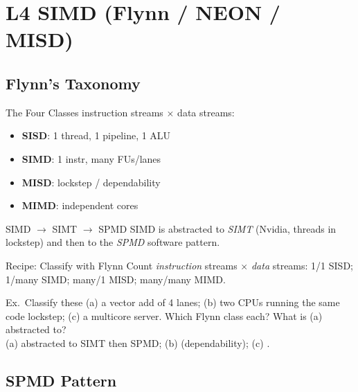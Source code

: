 \section{L4 SIMD (Flynn / NEON / MISD)}

\subsection{Flynn's Taxonomy}


\begin{definition}{The Four Classes}
    instruction streams $\times$ data streams:
    \begin{itemize}
        \item \textbf{SISD}: 1 thread, 1 pipeline, 1 ALU
        \item \textbf{SIMD}: 1 instr, many FUs/lanes
        \item \textbf{MISD}: lockstep / dependability
        \item \textbf{MIMD}: independent cores
    \end{itemize}
\end{definition}

\begin{concept}{SIMD $\to$ SIMT $\to$ SPMD}
    SIMD is abstracted to \emph{SIMT} (Nvidia, threads in lockstep) and then to the \emph{SPMD} software pattern.
\end{concept}

\multend

\begin{KR}{Recipe: Classify with Flynn}
    Count \emph{instruction} streams $\times$ \emph{data} streams: 1/1 SISD; 1/many SIMD; many/1 MISD; many/many MIMD.
\end{KR}

\begin{example2}{Ex.\ Classify these}
    (a) a vector add of 4 lanes; (b) two CPUs running the same code lockstep; (c) a multicore server. Which Flynn class each? What is (a) abstracted to?
     \\ 
    (a)  abstracted to SIMT then SPMD; (b)  (dependability); (c) .
\end{example2}

\subsection{SPMD Pattern}

